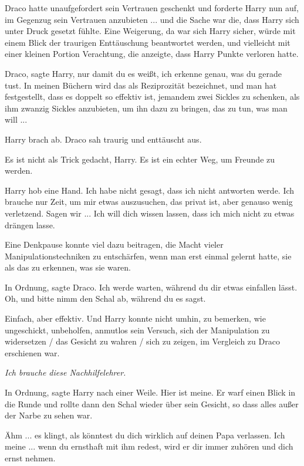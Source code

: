 Draco hatte unaufgefordert sein Vertrauen geschenkt und forderte Harry nun auf,
im Gegenzug sein Vertrauen anzubieten ... und die Sache war die, dass Harry sich
unter Druck gesetzt fühlte. Eine Weigerung, da war sich Harry sicher, würde mit
einem Blick der traurigen Enttäuschung beantwortet werden, und vielleicht mit
einer kleinen Portion Verachtung, die anzeigte, dass Harry Punkte verloren
hatte.

\glqq{}Draco\grqq{}, sagte Harry, \glqq{}nur damit du es weißt, ich erkenne
genau, was du gerade tust. In meinen Büchern wird das als Reziprozität
bezeichnet, und man hat festgestellt, dass es doppelt so effektiv ist, jemandem
zwei Sickles zu schenken, als ihm zwanzig Sickles anzubieten, um ihn dazu zu
bringen, das zu tun, was man will ...\grqq{}

Harry brach ab. Draco sah traurig und enttäuscht aus.

\glqq{}Es ist nicht als Trick gedacht, Harry. Es ist ein echter Weg, um Freunde
zu werden.\grqq{}

Harry hob eine Hand. \glqq{}Ich habe nicht gesagt, dass ich nicht antworten
werde. Ich brauche nur Zeit, um mir etwas auszusuchen, das privat ist, aber
genauso wenig verletzend. Sagen wir ... Ich will dich wissen lassen, dass ich
mich nicht zu etwas drängen lasse.\grqq{}

Eine Denkpause konnte viel dazu beitragen, die Macht vieler
Manipulationstechniken zu entschärfen, wenn man erst einmal gelernt hatte, sie
als das zu erkennen, was sie waren.

\glqq{}In Ordnung\grqq{}, sagte Draco. \glqq{}Ich werde warten, während du dir
etwas einfallen lässt. Oh, und bitte nimm den Schal ab, während du es
sagst.\grqq{}

Einfach, aber effektiv. Und Harry konnte nicht umhin, zu bemerken, wie
ungeschickt, unbeholfen, anmutlos sein Versuch, sich der Manipulation zu
widersetzen / das Gesicht zu wahren / sich zu zeigen, im Vergleich zu Draco
erschienen war.

\emph{Ich brauche diese Nachhilfelehrer.}

\glqq{}In Ordnung\grqq{}, sagte Harry nach einer Weile. \glqq{}Hier ist
meine.\grqq{} Er warf einen Blick in die Runde und rollte dann den Schal wieder
über sein Gesicht, so dass alles außer der Narbe zu sehen war.

\glqq{}Ähm ... es klingt, als könntest du dich wirklich auf deinen Papa
verlassen. Ich meine ... wenn du ernsthaft mit ihm redest, wird er dir immer
zuhören und dich ernst nehmen.\grqq{}

